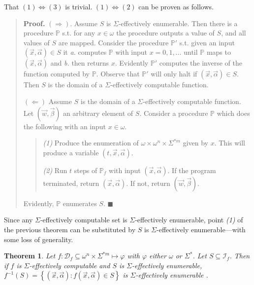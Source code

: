 \documentclass[a4paper, 12pt]{article}
\newtheorem{theorem}{Theorem}
\newtheorem{theorem}{Theorem}
\begin{document}
That $(1) \Leftrightarrow (3)$ is trivial. $(1) \Leftrightarrow (2)$ can be proven as
follows. 


\small
\begin{quote}

\textbf{Proof.} $(\Rightarrow)$. Assume $S$ is $\Sigma$-effectively enumerable.
Then there is a procedure $\mathbb{P}$ s.t. for any $x \in  \omega$ the
procedure outputs a value of $S$, and all values of $S$ are mapped. Consider the
procedure $\mathbb{P}'$ s.t. given an input $(\vec{x}, \vec{\alpha}) \in S$ it
\textit{a.} computes $\mathbb{P}$ with input  $x = 0, 1, \ldots$ until
$\mathbb{P}$ maps to $(\vec{x}, \vec{\alpha})$ and \textit{b.} then returns $x$.
Evidently $\mathbb{P}'$ computes the inverse of the function computed by
$\mathbb{P}$. Observe that $\mathbb{P}'$ will only halt if $(\vec{x},
\vec{\alpha}) \in S$. Then $S$ is the domain of a $\Sigma$-effectively
computable function.

$(\Leftarrow)$ Assume $S$ is the domain of a $\Sigma$-effectively computable
function. Let $(\vec{w}, \vec{\beta})$ an arbitrary element of $S$. Consider a
procedure $\mathbb{P}$ which does the following with an input $x \in \omega$.

\begin{quote}
    \textit{(1)} Produce the enumeration of $\omega \times \omega^{n} \times
    \Sigma^{*m} $ given by $x$. This will produce a variable $(t, \vec{x},
    \vec{\alpha})$.

    \textit{(2)} Run $t$ steps of $\mathbb{P}_f$ with input $(\vec{x},
    \vec{\alpha}) $. If the program terminated, return $(\vec{x},
    \vec{\alpha})$. If not, return $(\vec{w}, \vec{\beta})$.
\end{quote}

Evidently, $\mathbb{P}$ enumerates $S$. $\blacksquare$

\end{quote}
\normalsize

Since any $\Sigma$-effectively computable set is $\Sigma$-effectively
enumerable, point \textit{(1)} of the previous theorem can be substituted by $S$
is $\Sigma$-effectively enumerable---with some loss of generality.

\begin{theorem}
    Let $f : \mathcal{D}_f \subseteq \omega^{n} \times \Sigma^{*m} \mapsto \varphi$ with
    $\varphi$ either $\omega$ or $\Sigma^{*}$. Let $S \subseteq \mathcal{I}_f$.
    Then if $f$ is $\Sigma$-effectively computable and $S$ is
    $\Sigma$-effectively enumerable, $f^{-1}(S) = \left\{ (\vec{x},
    \vec{\alpha}) : f(\vec{x}, \vec{\alpha}) \in S \right\} $ is
    $\Sigma$-effectively enumerable .
\end{theorem}
\end{document}
